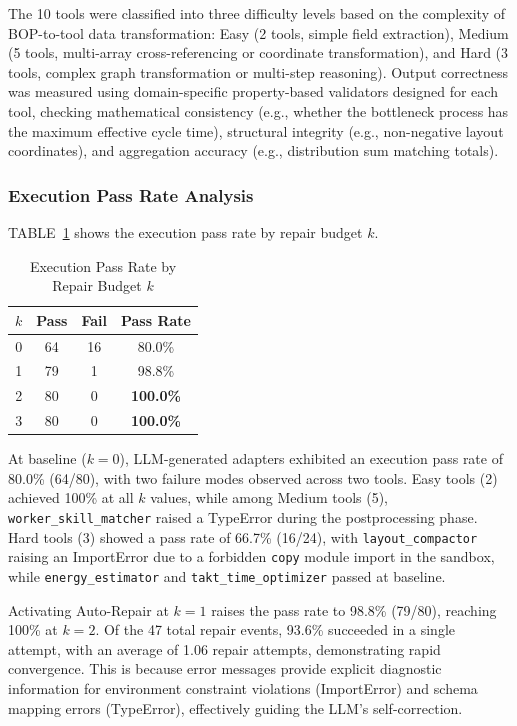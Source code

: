 \documentclass[conference]{IEEEtran}
\begin{document}
The 10 tools were classified into three difficulty levels based on the complexity of BOP-to-tool data transformation: Easy (2 tools, simple field extraction), Medium (5 tools, multi-array cross-referencing or coordinate transformation), and Hard (3 tools, complex graph transformation or multi-step reasoning). Output correctness was measured using domain-specific property-based validators designed for each tool, checking mathematical consistency (e.g., whether the bottleneck process has the maximum effective cycle time), structural integrity (e.g., non-negative layout coordinates), and aggregation accuracy (e.g., distribution sum matching totals).

\subsubsection{Execution Pass Rate Analysis}

TABLE~\ref{tab:pass_rate} shows the execution pass rate by repair budget $k$.

\begin{table}[!t]
\caption{Execution Pass Rate by Repair Budget $k$}
\label{tab:pass_rate}
\centering
\begin{tabular}{c c c c}
\hline
$k$ & \textbf{Pass} & \textbf{Fail} & \textbf{Pass Rate} \\
\hline
0 & 64 & 16 & 80.0\% \\
1 & 79 & 1  & 98.8\% \\
2 & 80 & 0  & \textbf{100.0\%} \\
3 & 80 & 0  & \textbf{100.0\%} \\
\hline
\end{tabular}
\end{table}

At baseline ($k{=}0$), LLM-generated adapters exhibited an execution pass rate of 80.0\% (64/80), with two failure modes observed across two tools. Easy tools (2) achieved 100\% at all $k$ values, while among Medium tools (5), \texttt{worker\_skill\_matcher} raised a TypeError during the postprocessing phase. Hard tools (3) showed a pass rate of 66.7\% (16/24), with \texttt{layout\_compactor} raising an ImportError due to a forbidden \texttt{copy} module import in the sandbox, while \texttt{energy\_estimator} and \texttt{takt\_time\_optimizer} passed at baseline.

Activating Auto-Repair at $k{=}1$ raises the pass rate to 98.8\% (79/80), reaching 100\% at $k{=}2$. Of the 47 total repair events, 93.6\% succeeded in a single attempt, with an average of 1.06 repair attempts, demonstrating rapid convergence. This is because error messages provide explicit diagnostic information for environment constraint violations (ImportError) and schema mapping errors (TypeError), effectively guiding the LLM's self-correction.
\end{document}
